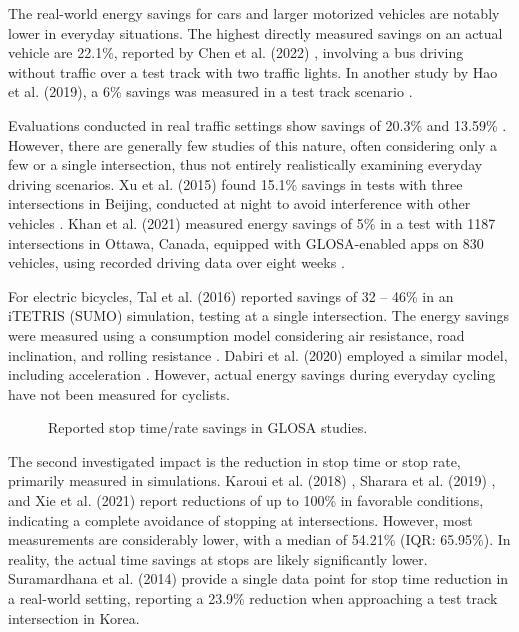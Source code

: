 The real-world energy savings for cars and larger motorized vehicles are notably lower in everyday situations. The highest directly measured savings on an actual vehicle are 22.1\%, reported by Chen et al. (2022) \cite{chen_developing_2022}, involving a bus driving without traffic over a test track with two traffic lights. In another study by Hao et al. (2019), a 6\% savings was measured in a test track scenario \cite{hao_eco-approach_2019}.

Evaluations conducted in real traffic settings show savings of 20.3\% \cite{koukoumidis_signalguru_2011} and 13.59\% \cite{xia_field_2012}. However, there are generally few studies of this nature, often considering only a few or a single intersection, thus not entirely realistically examining everyday driving scenarios. Xu et al. (2015) found 15.1\% savings in tests with three intersections in Beijing, conducted at night to avoid interference with other vehicles \cite{xu_bb_2015}. Khan et al. (2021) measured energy savings of 5\% in a test with 1187 intersections in Ottawa, Canada, equipped with GLOSA-enabled apps on 830 vehicles, using recorded driving data over eight weeks \cite{khan_eco-drive_2021}.

For electric bicycles, Tal et al. (2016) reported savings of 32 -- 46\% in an iTETRIS (SUMO) simulation, testing at a single intersection. The energy savings were measured using a consumption model considering air resistance, road inclination, and rolling resistance \cite{tal_vehicular-communications-based_2016}. Dabiri et al. (2020) employed a similar model, including acceleration \cite{dabiri_optimized_2020}. However, actual energy savings during everyday cycling have not been measured for cyclists.

\begin{figure}
\centering
\resizebox{\linewidth}{!}{%

}
\caption{Reported stop time/rate savings in GLOSA studies.}
\label{fig:related-work-stops}
\end{figure}

The second investigated impact is the reduction in stop time or stop rate, primarily measured in simulations. Karoui et al. (2018) \cite{karoui_efficiency_2018}, Sharara et al. (2019) \cite{sharara_impact_2019}, and Xie et al. (2021) \cite{xie_dynamic_2021} report reductions of up to 100\% in favorable conditions, indicating a complete avoidance of stopping at intersections. However, most measurements are considerably lower, with a median of 54.21\% (IQR: 65.95\%). In reality, the actual time savings at stops are likely significantly lower. Suramardhana et al. (2014) \cite{suramardhana_driver-centric_2014} provide a single data point for stop time reduction in a real-world setting, reporting a 23.9\% reduction when approaching a test track intersection in Korea.

